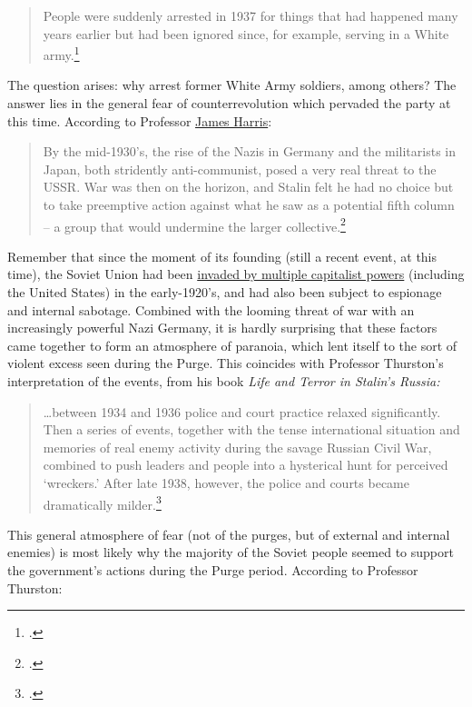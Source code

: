 \begin{quote}
People were suddenly arrested in 1937 for things that had happened many
years earlier but had been ignored since, for example, serving in a
  White army.\footcite{thurston1986desk}
\end{quote}

The question arises: why arrest former White Army soldiers, among
others? The answer lies in the general fear of counterrevolution which
pervaded the party at this time. According to Professor
\href{https://ahc.leeds.ac.uk/history/staff/64/professor-james-harris}{James
Harris}:

\begin{quote}
By the mid-1930's, the rise of the Nazis in Germany and the militarists
in Japan, both stridently anti-communist, posed a very real threat to
the USSR. War was then on the horizon, and Stalin felt he had no choice
but to take preemptive action against what he saw as a potential fifth
column -- a group that would undermine the larger collective.\footcite{harris2016}
\end{quote}

Remember that since the moment of its founding (still a recent event, at
this time), the Soviet Union had been
\href{https://www.warhistoryonline.com/world-war-i/the-day-that-the-usa-invaded-russia-and-fought-with-the-red-army-x.html}{invaded
by multiple capitalist powers} (including the United States) in the
early-1920's, and had also been subject to espionage and internal
sabotage. Combined with the looming threat of war with an increasingly
powerful Nazi Germany, it is hardly surprising that these factors came
together to form an atmosphere of paranoia, which lent itself to the
sort of violent excess seen during the Purge. This coincides with
Professor Thurston's interpretation of the events, from his book
\emph{Life and Terror in Stalin's Russia:}

\begin{quote}
\ldots between 1934 and 1936 police and court practice relaxed
significantly. Then a series of events, together with the tense
international situation and memories of real enemy activity during the
savage Russian Civil War, combined to push leaders and people into a
hysterical hunt for perceived `wreckers.' After late 1938, however, the
  police and courts became dramatically milder.\footcite{thurston1998life}
\end{quote}

This general atmosphere of fear (not of the purges, but of external and
internal enemies) is most likely why the majority of the Soviet people
seemed to support the government's actions during the Purge period.
According to Professor Thurston:

